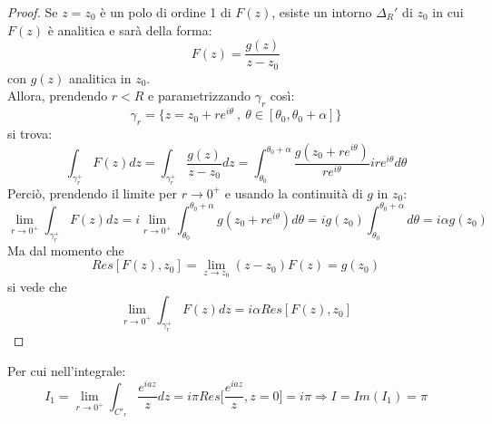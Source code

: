 \documentclass[twoside]{article}
\begin{document}
\begin{proof}
Se $z=z_0$ è un polo di ordine 1 di $F(z)$, esiste un intorno $\Delta_R '$ di $z_0$ in cui $F(z)$ è analitica e sarà della forma:
\begin{equation}
    F(z)=\frac{g(z)}{z-z_0}
\end{equation}
con $g(z)$ analitica in $z_0$.
\\
Allora, prendendo $r<R$ e parametrizzando $\gamma_r$ così:
\begin{equation}
    \gamma_r=\{z=z_0+re^{i\theta} \ , \ \theta \in [\theta_0,\theta_0+\alpha]\}
\end{equation}
si trova:
\begin{equation}
    \int_{\gamma_r ^+}F(z)dz=\int_{\gamma_r^+}\frac{g(z)}{z-z_0}dz=\int_{\theta_0}^{\theta_0+\alpha}\frac{g(z_0+re^{i\theta})}{re^{i\theta}}ire^{i\theta}d\theta
\end{equation}
Perciò, prendendo il limite per $r\to 0^+$ e usando la continuità di $g$ in $z_0$:
\begin{equation}
    \lim_{r\to 0^+}\int_{\gamma_r^+}F(z)dz=i \lim_{r \to 0^+} \int_{\theta_0}^{\theta_0 +\alpha} g(z_0+re^{i\theta})d\theta=ig(z_0)\int_{\theta_0}^{\theta_0 +\alpha}d\theta=i\alpha g(z_0)
\end{equation}
Ma dal momento che 
\begin{equation}
    Res[F(z),z_0]=\lim_{z\to z_0}(z-z_0)F(z)=g(z_0)
\end{equation}
si vede che
\begin{equation}
    \lim_{r \to 0^+}\int_{\gamma_r ^+}F(z) dz=i\alpha Res[F(z),z_0]
\end{equation}
\end{proof}
Per cui nell'integrale:
\begin{equation}
    I_1=\lim_{r\to 0^+}\int_{C'_r}\frac{e^{iaz}}{z}dz=i\pi Res\biggl[\frac{e^{iaz}}{z},z=0]=i\pi \Longrightarrow I=Im(I_1)=\pi
\end{equation}
\end{document}

